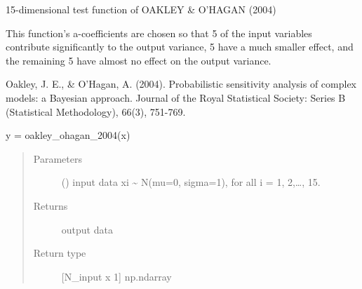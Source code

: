 \documentclass[letterpaper,10pt,english,openany,oneside]{sphinxmanual}
\begin{document}
\begin{fulllineitems}
\label{\detokenize{pygpc:pygpc.testfun.oakley_ohagan_2004}}
15-dimensional test function of OAKLEY \& O’HAGAN (2004)

This function’s a-coefficients are chosen so that 5 of the input
variables contribute significantly to the output variance, 5 have a
much smaller effect, and the remaining 5 have almost no effect on the
output variance.

Oakley, J. E., \& O’Hagan, A. (2004). Probabilistic sensitivity analysis
of complex models: a Bayesian approach. Journal of the Royal Statistical
Society: Series B (Statistical Methodology), 66(3), 751-769.

y = oakley\_ohagan\_2004(x)
\begin{quote}\begin{description}
\item[{Parameters}] \leavevmode
{} (\sphinxstyleliteralemphasis{\sphinxupquote{{[}}}\sphinxstyleliteralemphasis{\sphinxupquote{{]} }}) \textendash{} input data
xi \textasciitilde{} N(mu=0, sigma=1), for all i = 1, 2,…, 15.

\item[{Returns}] \leavevmode
{} \textendash{} output data

\item[{Return type}] \leavevmode
{[}N\_input x 1{]} np.ndarray

\end{description}\end{quote}

\end{fulllineitems}

\end{document}
